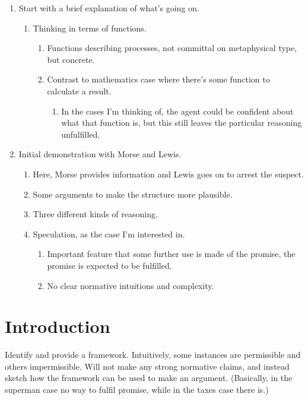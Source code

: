 \documentclass[10pt]{article}
\begin{document}
\begin{enumerate}
\item Start with a brief explanation of what's going on.
  \begin{enumerate}
  \item Thinking in terms of functions.
    \begin{enumerate}
    \item Functions describing processes, not committal on metaphysical type, but concrete.
    \item Contrast to mathematics case where there's some function to calculate a result.
      \begin{enumerate}
      \item In the cases I'm thinking of, the agent could be confident about what that function is, but this still leaves the particular reasoning unfulfilled.
      \end{enumerate}
    \end{enumerate}
  \end{enumerate}
\item Initial demonstration with Morse and Lewis.
  \begin{enumerate}
  \item Here, Morse provides information and Lewis goes on to arrest the suspect.
  \item Some arguments to make the structure more plausible.
  \item Three different kinds of reasoning.
  \item Speculation, as the case I'm interested in.
    \begin{enumerate}
    \item Important feature that some further use is made of the promise, the promise is expected to be fulfilled.
    \item No clear normative intuitions and complexity.
    \end{enumerate}
  \end{enumerate}
\end{enumerate}

\section{Introduction}
\label{sec:introduction}

\begin{note}
  Identify and provide a framework.
  Intuitively, some instances are permissible and others impermissible.
  Will not make any strong normative claims, and instead sketch how the framework can be used to make an argument.
  (Basically, in the superman case no way to fulfil promise, while in the taxes case there is.)
\end{note}
\end{document}
